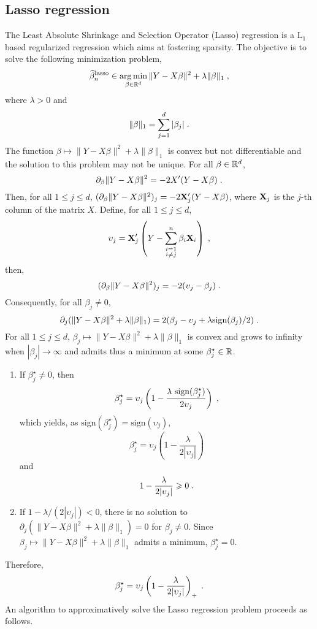 \subsection{Lasso regression}
The Least Absolute Shrinkage and Selection Operator (Lasso) regression is a $\mathrm{L}_1$ based regularized regression which aims at fostering sparsity. The objective is to solve the following minimization problem,
\[
\widehat \beta^{\mathrm{lasso}}_n\in  \argmin_{\beta\in\rset^d}  \|Y - X\beta\|^2 + \lambda\|\beta\|_1\eqsp,
\]
where $\lambda>0$ and
\[
\|\beta\|_1 = \sum_{j=1}^d|\beta_j|\;.
\]
The function $\beta \mapsto \|Y - X\beta\|^2 + \lambda\|\beta\|_1$ is convex but not differentiable and the solution to this problem may  not be unique. For all $\beta \in \mathbb{R}^d$,  
\[
\partial_\beta \|Y - X\beta\|^2 = - 2 X' (Y-X\beta)\;.
\]
Then, for all $1\leqslant j \leqslant d$, $(\partial_\beta \|Y - X\beta\|^2)_j = -2 {\bf X}_j' (Y-X\beta)$, where ${\bf X}_j$ is the $j$-th column of the matrix $X$. Define, for all $1\leqslant j \leqslant d$,
\[
\upsilon_{j}={\bf X}_{j}'\left(Y-\sum_{\substack{i=1\\ i\neq j}}^n\beta_{i}{\bf X}_{i}\right)\;,
\]
then,
\[
(\partial_\beta \|Y - X\beta\|^2)_j = -2( \upsilon_j - \beta_j)\;.
\]
Consequently, for all $\beta_j \neq 0$, 
\[
\partial_j ( \|Y - X\beta\|^2 +  \lambda\|\beta\|_1)= 2( \beta_j - \upsilon_j + \lambda\textrm{sign}(\beta_j)/2)\;.
\]
For all $1\leqslant j\leqslant d$,  $\beta_j \mapsto  \|Y - X\beta\|^2 + \lambda\|\beta\|_1$ is convex and grows to infinity when $|\beta_j|\to \infty$ and admits thus a minimum at some $\beta_j^{\star}\in\mathbb{R}$. 
\begin{enumerate}[-]
\item If $\beta_j^{\star} \neq 0$, then
\[
\beta_j^{\star} = \upsilon_j\left( 1 - \frac{\lambda ~\textrm{sign}(\beta_j^{\star})}{2 \upsilon_j}\right)\;,
\]
which yields, as  $\textrm{sign}(\beta_j^{\star}) = \textrm{sign}(\upsilon_j)$,
\[
\beta_j^{\star} = \upsilon_j\left(1 - \frac{\lambda}{2 |\upsilon_j|}\right)
\]
and
\[
1 - \frac{\lambda}{2 |\upsilon_j|} \geqslant 0\;.
\]
\item If $1 - \lambda/(2 |\upsilon_j|)<0$, there is no solution to $\partial_j ( \|Y - X\beta\|^2 +  \lambda\|\beta\|_1)=0$ for $\beta_j \neq 0$.  Since $\beta_j \mapsto  \|Y - X\beta\|^2 + \lambda\|\beta\|_1$ admits a minimum, $\beta_j^{\star}=0$. 
\end{enumerate}
Therefore,
\[
\beta_j^{\star} = \upsilon_j\left( 1 - \frac{\lambda}{2 |\upsilon_j|}\right)_+\;.
\]
An algorithm to approximatively solve the Lasso regression problem proceeds as follows.


